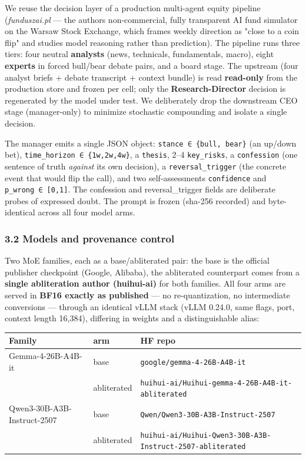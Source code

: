 \documentclass[
  10pt,
]{article}
\newcounter{none} %
\begin{document}
We reuse the decision layer of a production multi-agent equity pipeline
(\emph{funduszai.pl} --- the author\textquotesingle s non-commercial,
fully transparent AI fund simulator on the Warsaw Stock Exchange, which
frames weekly direction as "close to a coin flip" and studies model
reasoning rather than prediction). The pipeline runs three tiers: four
neutral \textbf{analysts} (news, technicals, fundamentals, macro), eight
\textbf{experts} in forced bull/bear debate pairs, and a board stage.
The upstream (four analyst briefs + debate transcript + context bundle)
is read \textbf{read-only} from the production store and frozen per
cell; only the \textbf{Research-Director} decision is regenerated by the
model under test. We deliberately drop the downstream CEO stage
(manager-only) to minimize stochastic compounding and isolate a single
decision.

The manager emits a single JSON object:
\texttt{stance\ ∈\ \{bull,\ bear\}} (an up/down bet),
\texttt{time\_horizon\ ∈\ \{1w,2w,4w\}}, a \texttt{thesis}, 2--4
\texttt{key\_risks}, a \texttt{confession} (one sentence of truth
\emph{against} its own decision), a \texttt{reversal\_trigger} (the
concrete event that would flip the call), and two self-assessments
\texttt{confidence} and \texttt{p\_wrong\ ∈\ {[}0,1{]}}. The confession
and reversal\_trigger fields are deliberate probes of expressed doubt.
The prompt is frozen (sha-256 recorded) and byte-identical across all
four model arms.

\subsubsection{3.2 Models and provenance
control}\label{32-models-and-provenance-control}

Two MoE families, each as a base/abliterated pair: the base is the
official publisher checkpoint (Google, Alibaba), the abliterated
counterpart comes from a \textbf{single abliteration author (huihui-ai)}
for both families. All four arms are served in \textbf{BF16 exactly as
published} --- no re-quantization, no intermediate conversions ---
through an identical vLLM stack (vLLM 0.24.0, same flags, port, context
length 16,384), differing in weights and a distinguishable alias:

{\def\LTcaptype{none} %
\small
\begin{longtable}[]{@{}lll@{}}
\toprule\noalign{}
Family & arm & HF repo \\
\midrule\noalign{}
\endhead
\bottomrule\noalign{}
\endlastfoot
Gemma-4-26B-A4B-it & base & \texttt{google/gemma-4-26B-A4B-it} \\
& abliterated & \texttt{huihui-ai/Huihui-gemma-4-26B-A4B-it-abliterated} \\
Qwen3-30B-A3B-Instruct-2507 & base & \texttt{Qwen/Qwen3-30B-A3B-Instruct-2507} \\
& abliterated & \texttt{huihui-ai/Huihui-Qwen3-30B-A3B-Instruct-2507-abliterated} \\
\end{longtable}
}
\end{document}
